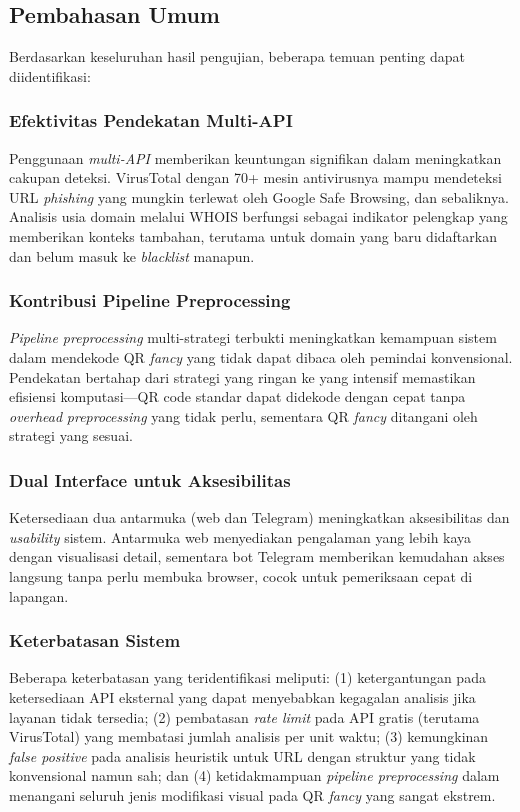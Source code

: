 \documentclass[conference]{IEEEtran}
\begin{document}
\subsection{Pembahasan Umum}

Berdasarkan keseluruhan hasil pengujian, beberapa temuan penting dapat diidentifikasi:

\subsubsection{Efektivitas Pendekatan Multi-API}
Penggunaan \textit{multi-API} memberikan keuntungan signifikan dalam meningkatkan cakupan deteksi. VirusTotal dengan 70+ mesin antivirusnya mampu mendeteksi URL \textit{phishing} yang mungkin terlewat oleh Google Safe Browsing, dan sebaliknya. Analisis usia domain melalui WHOIS berfungsi sebagai indikator pelengkap yang memberikan konteks tambahan, terutama untuk domain yang baru didaftarkan dan belum masuk ke \textit{blacklist} manapun.

\subsubsection{Kontribusi Pipeline Preprocessing}
\textit{Pipeline preprocessing} multi-strategi terbukti meningkatkan kemampuan sistem dalam mendekode QR \textit{fancy} yang tidak dapat dibaca oleh pemindai konvensional. Pendekatan bertahap dari strategi yang ringan ke yang intensif memastikan efisiensi komputasi---QR code standar dapat didekode dengan cepat tanpa \textit{overhead} \textit{preprocessing} yang tidak perlu, sementara QR \textit{fancy} ditangani oleh strategi yang sesuai.

\subsubsection{Dual Interface untuk Aksesibilitas}
Ketersediaan dua antarmuka (web dan Telegram) meningkatkan aksesibilitas dan \textit{usability} sistem. Antarmuka web menyediakan pengalaman yang lebih kaya dengan visualisasi detail, sementara bot Telegram memberikan kemudahan akses langsung tanpa perlu membuka browser, cocok untuk pemeriksaan cepat di lapangan.

\subsubsection{Keterbatasan Sistem}
Beberapa keterbatasan yang teridentifikasi meliputi: (1) ketergantungan pada ketersediaan API eksternal yang dapat menyebabkan kegagalan analisis jika layanan tidak tersedia; (2) pembatasan \textit{rate limit} pada API gratis (terutama VirusTotal) yang membatasi jumlah analisis per unit waktu; (3) kemungkinan \textit{false positive} pada analisis heuristik untuk URL dengan struktur yang tidak konvensional namun sah; dan (4) ketidakmampuan \textit{pipeline preprocessing} dalam menangani seluruh jenis modifikasi visual pada QR \textit{fancy} yang sangat ekstrem.
\end{document}

